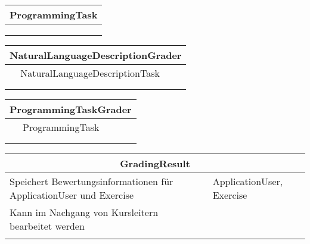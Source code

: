 \documentclass[11pt]{article}
\begin{document}
\begin{table}[h]
\begin{tabularx}{\textwidth}{|X|X|}
\hline
\multicolumn{2}{|c|}{ProgrammingTask}\\ \hline
& \\  \hline
& \\ \hline
 & \\ \hline
\end{tabularx}
\end{table}
\begin{table}[h]
\begin{tabularx}{\textwidth}{|X|X|}
\hline
\multicolumn{2}{|c|}{NaturalLanguageDescriptionGrader}\\ \hline
& NaturalLanguageDescriptionTask\\  \hline
& \\ \hline
 & \\ \hline
\end{tabularx}
\end{table}

\begin{table}[h]
\begin{tabularx}{\textwidth}{|X|X|}
\hline
\multicolumn{2}{|c|}{ProgrammingTaskGrader}\\ \hline
& ProgrammingTask\\  \hline
& \\ \hline
 & \\ \hline
\end{tabularx}
\end{table}

\begin{table}[h]
\begin{tabularx}{\textwidth}{|X|X|}
\hline
\multicolumn{2}{|c|}{GradingResult}\\ \hline
Speichert Bewertungsinformationen für ApplicationUser und Exercise& ApplicationUser, Exercise \\  \hline
Kann im Nachgang von Kursleitern bearbeitet werden& \\ \hline
 & \\ \hline
\end{tabularx}
\end{table}
\end{document}

